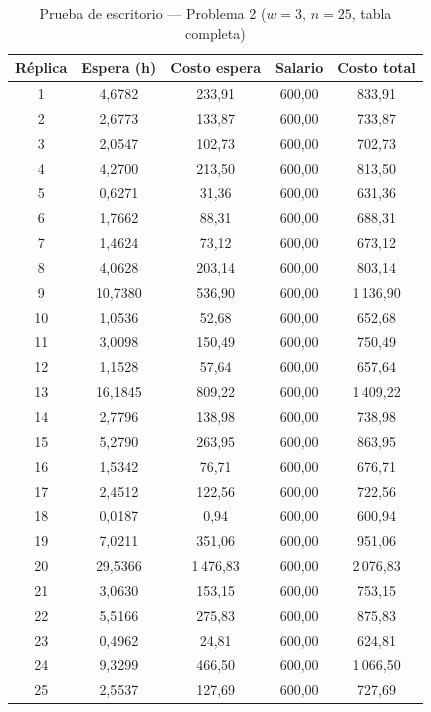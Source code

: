 \documentclass[12pt,a4paper]{article}
\begin{document}
\begin{table}[H]
\centering
\caption{Prueba de escritorio — Problema 2 ($w=3$, $n=25$, tabla completa)}
\small
\begin{tabular}{ccccc}
\toprule
\textbf{Réplica} & \textbf{Espera (h)} & \textbf{Costo espera} & \textbf{Salario} & \textbf{Costo total} \\
\midrule
1 & 4,6782 & 233,91 & 600,00 & 833,91 \\
2 & 2,6773 & 133,87 & 600,00 & 733,87 \\
3 & 2,0547 & 102,73 & 600,00 & 702,73 \\
4 & 4,2700 & 213,50 & 600,00 & 813,50 \\
5 & 0,6271 & 31,36 & 600,00 & 631,36 \\
6 & 1,7662 & 88,31 & 600,00 & 688,31 \\
7 & 1,4624 & 73,12 & 600,00 & 673,12 \\
8 & 4,0628 & 203,14 & 600,00 & 803,14 \\
9 & 10,7380 & 536,90 & 600,00 & 1\,136,90 \\
10 & 1,0536 & 52,68 & 600,00 & 652,68 \\
11 & 3,0098 & 150,49 & 600,00 & 750,49 \\
12 & 1,1528 & 57,64 & 600,00 & 657,64 \\
13 & 16,1845 & 809,22 & 600,00 & 1\,409,22 \\
14 & 2,7796 & 138,98 & 600,00 & 738,98 \\
15 & 5,2790 & 263,95 & 600,00 & 863,95 \\
16 & 1,5342 & 76,71 & 600,00 & 676,71 \\
17 & 2,4512 & 122,56 & 600,00 & 722,56 \\
18 & 0,0187 & 0,94 & 600,00 & 600,94 \\
19 & 7,0211 & 351,06 & 600,00 & 951,06 \\
20 & 29,5366 & 1\,476,83 & 600,00 & 2\,076,83 \\
21 & 3,0630 & 153,15 & 600,00 & 753,15 \\
22 & 5,5166 & 275,83 & 600,00 & 875,83 \\
23 & 0,4962 & 24,81 & 600,00 & 624,81 \\
24 & 9,3299 & 466,50 & 600,00 & 1\,066,50 \\
25 & 2,5537 & 127,69 & 600,00 & 727,69 \\
\bottomrule
\end{tabular}
\end{table}
\end{document}
